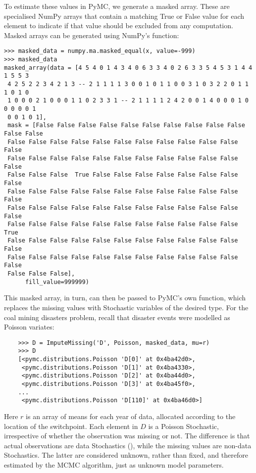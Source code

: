 To estimate these values in PyMC, we generate a masked array. These are specialised NumPy arrays that contain a matching True or False value for each element to indicate if that value should be excluded from any computation. Masked arrays can be generated using NumPy's  function:
\begin{verbatim}
>>> masked_data = numpy.ma.masked_equal(x, value=-999)
>>> masked_data
masked_array(data = [4 5 4 0 1 4 3 4 0 6 3 3 4 0 2 6 3 3 5 4 5 3 1 4 4 1 5 5 3
 4 2 5 2 2 3 4 2 1 3 -- 2 1 1 1 1 3 0 0 1 0 1 1 0 0 3 1 0 3 2 2 0 1 1 1 0 1 0
 1 0 0 0 2 1 0 0 0 1 1 0 2 3 3 1 -- 2 1 1 1 1 2 4 2 0 0 1 4 0 0 0 1 0 0 0 0 0 1
 0 0 1 0 1],
 mask = [False False False False False False False False False False False False
 False False False False False False False False False False False False
 False False False False False False False False False False False False
 False False False  True False False False False False False False False
 False False False False False False False False False False False False
 False False False False False False False False False False False False
 False False False False False False False False False False False  True
 False False False False False False False False False False False False
 False False False False False False False False False False False False
 False False False],
      fill_value=999999)

\end{verbatim}

This masked array, in turn, can then be passed to PyMC's own  function, which replaces the missing values with Stochastic variables of the desired type. For the coal mining disasters problem, recall that disaster events were modelled as Poisson variates:

\begin{verbatim}
	>>> D = ImputeMissing('D', Poisson, masked_data, mu=r)
	>>> D
	[<pymc.distributions.Poisson 'D[0]' at 0x4ba42d0>,
	 <pymc.distributions.Poisson 'D[1]' at 0x4ba4330>,
	 <pymc.distributions.Poisson 'D[2]' at 0x4ba44d0>,
	 <pymc.distributions.Poisson 'D[3]' at 0x4ba45f0>,
	...
	 <pymc.distributions.Poisson 'D[110]' at 0x4ba46d0>]
\end{verbatim}

Here $r$ is an array of means for each year of data, allocated according to the location of the switchpoint. Each element in $D$ is a Poisson Stochastic, irrespective of whether the observation was missing or not. The difference is that actual observations are data Stochastics (), while the missing values are non-data Stochastics. The latter are considered unknown, rather than fixed, and therefore estimated by the MCMC algorithm, just as unknown model parameters.


